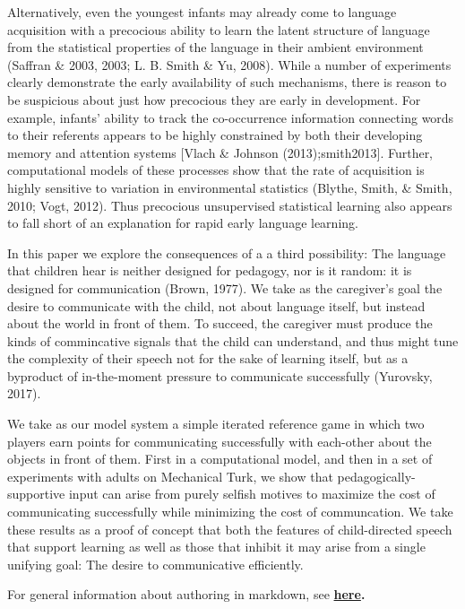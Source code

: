 \documentclass[10pt, letterpaper]{article}
\begin{document}
Alternatively, even the youngest infants may already come to language
acquisition with a precocious ability to learn the latent structure of
language from the statistical properties of the language in their
ambient environment (Saffran \& 2003, 2003; L. B. Smith \& Yu, 2008).
While a number of experiments clearly demonstrate the early availability
of such mechanisms, there is reason to be suspicious about just how
precocious they are early in development. For example, infants' ability
to track the co-occurrence information connecting words to their
referents appears to be highly constrained by both their developing
memory and attention systems {[}Vlach \& Johnson (2013);smith2013{]}.
Further, computational models of these processes show that the rate of
acquisition is highly sensitive to variation in environmental statistics
(Blythe, Smith, \& Smith, 2010; Vogt, 2012). Thus precocious
unsupervised statistical learning also appears to fall short of an
explanation for rapid early language learning.

In this paper we explore the consequences of a a third possibility: The
language that children hear is neither designed for pedagogy, nor is it
random: it is designed for communication (Brown, 1977). We take as the
caregiver's goal the desire to communicate with the child, not about
language itself, but instead about the world in front of them. To
succeed, the caregiver must produce the kinds of commincative signals
that the child can understand, and thus might tune the complexity of
their speech not for the sake of learning itself, but as a byproduct of
in-the-moment pressure to communicate successfully (Yurovsky, 2017).

We take as our model system a simple iterated reference game in which
two players earn points for communicating successfully with each-other
about the objects in front of them. First in a computational model, and
then in a set of experiments with adults on Mechanical Turk, we show
that pedagogically-supportive input can arise from purely selfish
motives to maximize the cost of communicating successfully while
minimizing the cost of communcation. We take these results as a proof of
concept that both the features of child-directed speech that support
learning as well as those that inhibit it may arise from a single
unifying goal: The desire to communicative efficiently.

For general information about authoring in markdown, see
\textbf{\href{http://rmarkdown.rstudio.com/authoring_basics.html}{here}.}
\end{document}
